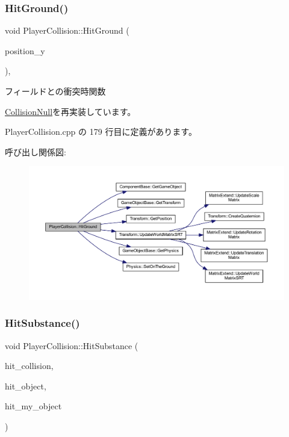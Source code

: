 \subsubsection{\texorpdfstring{Hit\+Ground()}{HitGround()}}
{\footnotesize\ttfamily void Player\+Collision\+::\+Hit\+Ground (\begin{DoxyParamCaption}\item[{float}]{position\+\_\+y }\end{DoxyParamCaption})\hspace{0.3cm}{\ttfamily [override]}, {\ttfamily [virtual]}}



フィールドとの衝突時関数 



\mbox{\hyperlink{class_collision_null_a75900c2cec4e49336701e2e3c64e5bfe}{Collision\+Null}}を再実装しています。



 Player\+Collision.\+cpp の 179 行目に定義があります。

呼び出し関係図\+:\nopagebreak
\begin{figure}[H]
\begin{center}
\leavevmode
\includegraphics[width=350pt]{class_player_collision_a3522ce17b1e1752f2737c2243582ecb0_cgraph}
\end{center}
\end{figure}
\mbox{\label{class_player_collision_a5048cc608d72d03d02b23c5533dbfd10}} 
\subsubsection{\texorpdfstring{Hit\+Substance()}{HitSubstance()}}
{\footnotesize\ttfamily void Player\+Collision\+::\+Hit\+Substance (\begin{DoxyParamCaption}\item[{\mbox{\hyperlink{class_collision_base}{Collision\+Base}} $\ast$}]{hit\+\_\+collision,  }\item[{\mbox{\hyperlink{class_collision_object}{Collision\+Object}} $\ast$}]{hit\+\_\+object,  }\item[{\mbox{\hyperlink{class_collision_object}{Collision\+Object}} $\ast$}]{hit\+\_\+my\+\_\+object }\end{DoxyParamCaption})\hspace{0.3cm}{\ttfamily [private]}}



